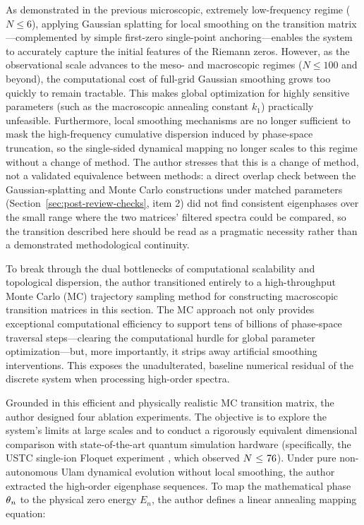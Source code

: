 \documentclass[mca,article,submit,oneauthor,pdftex]{Definitions/mdpi}
\begin{document}
As demonstrated in the previous microscopic, extremely low-frequency
regime (\({N} {\ensuremath{\le} 6}\)), applying Gaussian splatting for local
smoothing on the transition matrix---complemented by simple first-zero
single-point anchoring---enables the system to accurately capture the
initial features of the Riemann zeros. However, as the observational
scale advances to the meso- and macroscopic regimes
(\({N} {\ensuremath{\le} 100}\) and beyond), the computational cost of full-grid
Gaussian smoothing grows too quickly to remain tractable. This makes
global optimization for highly sensitive parameters (such as the
macroscopic annealing constant \({k}_{\text{1}}\)) practically
unfeasible. Furthermore, local smoothing mechanisms are no longer
sufficient to mask the high-frequency cumulative dispersion induced by
phase-space truncation, so the single-sided dynamical mapping no longer
scales to this regime without a change of method. The author stresses that this is a
change of method, not a validated equivalence between methods: a direct
overlap check between the Gaussian-splatting and Monte Carlo constructions
under matched parameters (Section~\ref{sec:post-review-checks}, item 2)
did not find consistent eigenphases over the small range where the two
matrices' filtered spectra could be compared, so the transition described
here should be read as a pragmatic necessity rather than a demonstrated
methodological continuity.

To break through the dual bottlenecks of computational scalability and
topological dispersion, the author transitioned entirely to a high-throughput
Monte Carlo (MC) trajectory sampling method for constructing macroscopic
transition matrices in this section. The MC approach not only provides
exceptional computational efficiency to support tens of billions of
phase-space traversal steps---clearing the computational hurdle for
global parameter optimization---but, more importantly, it strips away
artificial smoothing interventions. This exposes the unadulterated,
baseline numerical residual of the discrete system when processing
high-order spectra.

Grounded in this efficient and physically realistic MC transition
matrix, the author designed four ablation experiments. The objective is to
explore the system's limits at large scales and to conduct a rigorously
equivalent dimensional comparison with state-of-the-art quantum
simulation hardware (specifically, the USTC single-ion Floquet
experiment \cite{he2020,he2021}, which observed \({N}~\text{\ensuremath{\le}~76}\)). Under pure
non-autonomous Ulam dynamical evolution without local smoothing, the author
extracted the high-order eigenphase sequences. To map the mathematical
phase \(\text{\ensuremath{\theta}}_{{n}}\) to the physical zero energy
\({E}_{{n}}\), the author defines a linear annealing mapping equation:
\end{document}
